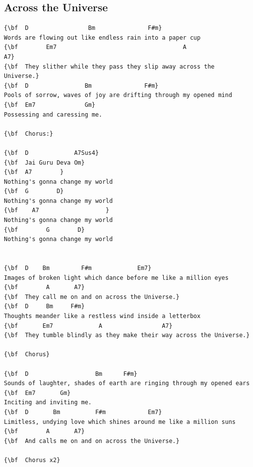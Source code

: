 \documentclass[a4paper]{article}
\begin{document}
\subsection{Across the Universe}
\begin{Verbatim}[commandchars=\\\{\}]
{\bf  D                 Bm               F#m}
Words are flowing out like endless rain into a paper cup
{\bf        Em7                                    A                  A7}
{\bf  They slither while they pass they slip away across the Universe.}
{\bf  D                Bm               F#m}
Pools of sorrow, waves of joy are drifting through my opened mind
{\bf  Em7              Gm}
Possessing and caressing me.

{\bf  Chorus:}

{\bf  D             A7Sus4}
{\bf  Jai Guru Deva Om}
{\bf  A7        }
Nothing's gonna change my world
{\bf  G        D}
Nothing's gonna change my world
{\bf    A7                   }
Nothing's gonna change my world
{\bf        G        D}
Nothing's gonna change my world


{\bf  D    Bm         F#m             Em7}
Images of broken light which dance before me like a million eyes
{\bf        A       A7}
{\bf  They call me on and on across the Universe.}
{\bf  D     Bm     F#m}
Thoughts meander like a restless wind inside a letterbox
{\bf       Em7             A                 A7}
{\bf  They tumble blindly as they make their way across the Universe.}

{\bf  Chorus}

{\bf  D                   Bm      F#m}
Sounds of laughter, shades of earth are ringing through my opened ears
{\bf  Em7       Gm}
Inciting and inviting me.
{\bf  D       Bm          F#m            Em7}
Limitless, undying love which shines around me like a million suns
{\bf        A       A7}
{\bf  And calls me on and on across the Universe.}

{\bf  Chorus x2}


\end{Verbatim}
\newpage
\end{document}
